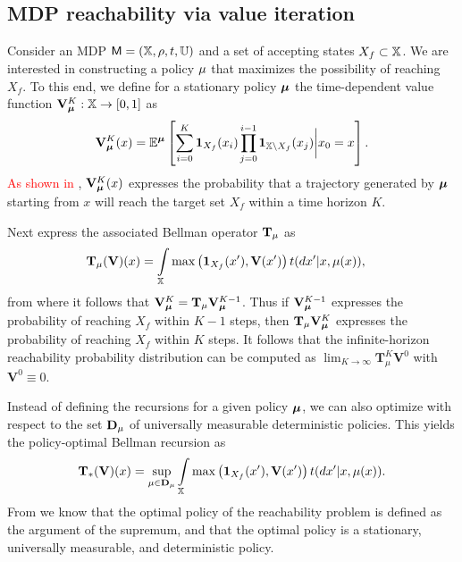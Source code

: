 \documentclass{ifacconf}
\newcommand{\ind}{\mathbf{1}}
\begin{document}
\subsection{MDP reachability via value iteration}

Consider an MDP $\mathsf{M} = ({\mathbb{X}}, \rho, t, {\mathbb{U}})$ and a set of accepting states $X_f \subset {\mathbb{X}}$. We are interested in constructing a policy ${\mu}$ that maximizes the possibility of reaching $X_f$. To this end, we define for a stationary policy ${\boldsymbol{\mu}}$ the time-dependent value function $\mathbf V_{\boldsymbol{\mu}}^K:{\mathbb{X}}\rightarrow [0,1]$ as
\begin{equation*}
\label{eq:Valfunc}
  \mathbf V^K_\polb(x)=\mathbb{E}^\polb \left[ \sum\limits_{ i=0 }^K \ind_{X_f}( x_i) \prod \limits_{\mathclap{j = 0}}^{i-1}\ind_{ \X \setminus X_f}( x_j ) \bigg| x_0 = x \right].
\end{equation*}
\textcolor{red}{As shown in \citep{Abate1}}, $\mathbf V_{\boldsymbol{\mu}}^K (x)$ expresses the probability that a trajectory generated by ${\boldsymbol{\mu}}$ starting from $x$ will reach the target set $X_f$ within a time horizon $K$.

Next express the associated Bellman operator ${\mathbf {T}}_{\mu}$ as
\begin{align}
\label{eq:V_recopt}
  & \Bel_\pol (\mathbf  V)(x) = \int_\X \max \left( \mathbf 1_{X_f}( x'), \mathbf V(x') \right) {\tr}(d  x' | x,\pol( x)),
\end{align}
from where it follows that $\mathbf V_{\boldsymbol{\mu}}^{K} = {\mathbf {T}}_{\mu} \mathbf V_{\boldsymbol{\mu}}^{K-1}$. Thus if $\mathbf V_{\boldsymbol{\mu}}^{K-1} $ expresses the probability of reaching $X_f$ within $K-1$ steps, then $ {\mathbf {T}}_{\mu} \mathbf V_{\boldsymbol{\mu}}^{K} $ expresses the probability of reaching $X_f$ within $K$ steps. It follows that the infinite-horizon reachability probability distribution can be computed as $\lim_{K\rightarrow \infty}\mathbf T_\mu^{K} \mathbf V^0$ with $\mathbf{V}^0 \equiv 0$.

Instead of defining the recursions for a given policy ${\boldsymbol{\mu}}$, we can also optimize with respect to the set $\mathbf D_{{\mu}}$ of universally measurable deterministic policies. This yields the policy-optimal Bellman recursion as
\begin{equation*}
  \Bel_\ast (\mathbf V)(x) =\sup_{\pol \in \mathbf D_{\pol}} \int_{\X} \max \left( \mathbf 1_{X_f}( x'), \mathbf V(x') \right) {\tr}(d  x' | x,\pol( x)).
\end{equation*}
From \cite{Abate1} we know that the optimal policy of the reachability problem is defined as the argument of the supremum, and that the optimal policy is a stationary, universally measurable, and deterministic policy.
\end{document}
